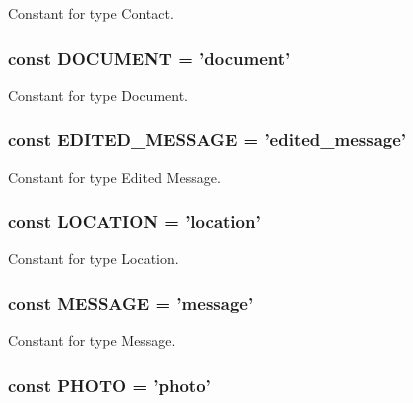 Constant for type Contact. \hypertarget{class_telegram_a6494d627239bf203e03297843bf52053}{
\subsubsection[{D\-O\-C\-U\-M\-E\-N\-T}]{\setlength{\rightskip}{0pt plus 5cm}const D\-O\-C\-U\-M\-E\-N\-T = 'document'}}\label{class_telegram_a6494d627239bf203e03297843bf52053}
Constant for type Document. \hypertarget{class_telegram_aa469cc007db1409d59a5e5bfac0633ec}{
\subsubsection[{E\-D\-I\-T\-E\-D\-\_\-\-M\-E\-S\-S\-A\-G\-E}]{\setlength{\rightskip}{0pt plus 5cm}const E\-D\-I\-T\-E\-D\-\_\-\-M\-E\-S\-S\-A\-G\-E = 'edited\-\_\-message'}}\label{class_telegram_aa469cc007db1409d59a5e5bfac0633ec}
Constant for type Edited Message. \hypertarget{class_telegram_aca699735a6cec340e45cde5c623bdb32}{
\subsubsection[{L\-O\-C\-A\-T\-I\-O\-N}]{\setlength{\rightskip}{0pt plus 5cm}const L\-O\-C\-A\-T\-I\-O\-N = 'location'}}\label{class_telegram_aca699735a6cec340e45cde5c623bdb32}
Constant for type Location. \hypertarget{class_telegram_af9b451d04eb24044a2d4112be10de570}{
\subsubsection[{M\-E\-S\-S\-A\-G\-E}]{\setlength{\rightskip}{0pt plus 5cm}const M\-E\-S\-S\-A\-G\-E = 'message'}}\label{class_telegram_af9b451d04eb24044a2d4112be10de570}
Constant for type Message. \hypertarget{class_telegram_a0aeb08e94e66f9d958f565530b6b6a80}{
\subsubsection[{P\-H\-O\-T\-O}]{\setlength{\rightskip}{0pt plus 5cm}const P\-H\-O\-T\-O = 'photo'}}\label{class_telegram_a0aeb08e94e66f9d958f565530b6b6a80}
